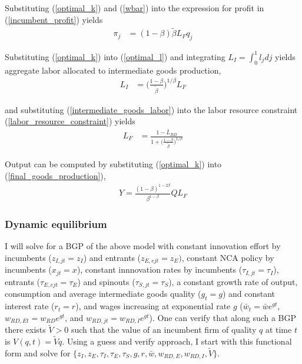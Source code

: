 \documentclass[11pt,english]{article}
\theoremstyle{remark}
\begin{document}
Substituting (\ref{optimal_k}) and (\ref{wbar}) into the expression for profit in (\ref{incumbent_profit}) yields
\begin{align}
\pi_j &= (1-\beta) \tilde{\beta} L_F q_j \label{profits_eq}
\end{align}

Substituting (\ref{optimal_k}) into (\ref{optimal_l}) and integrating $L_I = \int_0^1 l_j dj$ yields aggregate labor allocated to intermediate goods production,
\begin{align}
L_I &= \Big( \frac{1-\beta}{\tilde{\beta}} \Big)^{1 / \beta} L_F \label{intermediate_goods_labor}
\end{align}

and substituting (\ref{intermediate_goods_labor}) into the labor resource constraint (\ref{labor_resource_constraint}) yields
\begin{align}
L_F &= \frac{1 - \bar{L}_{RD}}{1 + \Big(\frac{1-\beta}{\tilde{\beta}}\Big)^{1/\beta}}
\end{align}

Output can be computed by substituting (\ref{optimal_k}) into (\ref{final_goods_production}), 
\begin{align}
Y = \frac{(1-\beta)^{1-2\beta}}{\beta^{1-\beta}} Q L_F \label{flow_output}
\end{align}

\subsubsection{Dynamic equilibrium}\label{subsubsec:dynamic_equilibrium_original_solution}

I will solve for a BGP of the above model with constant innovation effort by incumbents ($z_{I,jt} = z_I$) and entrants ($z_{E,ejt} = z_{E})$, constant NCA policy by incumbents ($x_{jt} = x$), constant innnovation rates by incumbents ($\tau_{I,jt} = \tau_I$), entrants ($\tau_{E,ejt} = \tau_E$) and spinouts ($\tau_{S,jt} = \tau_S$), a constant growth rate of output, consumption and average intermediate goods quality ($g_t = g$) and constant interest rate ($r_t = r$), and wages increasing at exponential rate $g$ ($\bar{w}_t = \bar{w} e^{gt}$, $w_{RD,Et} = w_{RD}e^{gt}$, and $w_{RD,jt} = w_{RD,I}e^{gt}$). One can verify that along such a BGP there exists $\tilde{V} > 0$ such that the value of an incumbent firm of quality $q$ at time $t$ is $V(q,t) = \tilde{V}q$. Using a guess and verify approach, I start with this functional form and solve for $\{z_I,z_E,\tau_I,\tau_E,\tau_S,g,r,\bar{w},w_{RD,E},w_{RD,I},\tilde{V}\}$. 
\end{document}
